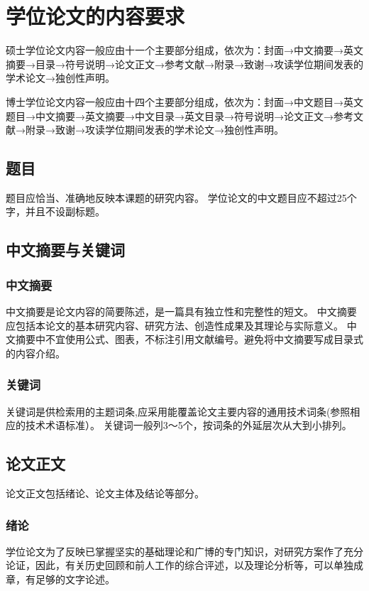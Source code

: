 \section{学位论文的内容要求}

硕士学位论文内容一般应由十一个主要部分组成，依次为：封面→中文摘要→英文摘要→目录→符号说明→论文正文→参考文献→附录→致谢→攻读学位期间发表的学术论文→独创性声明。


博士学位论文内容一般应由十四个主要部分组成，依次为：封面→中文题目→英文题目→中文摘要→英文摘要→中文目录→英文目录→符号说明→论文正文→参考文献→附录→致谢→攻读学位期间发表的学术论文→独创性声明。

\subsection{题目}
题目应恰当、准确地反映本课题的研究内容。
学位论文的中文题目应不超过25个字，并且不设副标题。

\subsection{中文摘要与关键词}

\subsubsection{中文摘要}
中文摘要是论文内容的简要陈述，是一篇具有独立性和完整性的短文。
中文摘要应包括本论文的基本研究内容、研究方法、创造性成果及其理论与实际意义。
中文摘要中不宜使用公式、图表，不标注引用文献编号。避免将中文摘要写成目录式的内容介绍。

\subsubsection{关键词}
关键词是供检索用的主题词条,应采用能覆盖论文主要内容的通用技术词条(参照相应的技术术语标准）。
关键词一般列3～5个，按词条的外延层次从大到小排列。

\subsection{论文正文}
论文正文包括绪论、论文主体及结论等部分。

\subsubsection{绪论}
学位论文为了反映已掌握坚实的基础理论和广博的专门知识，对研究方案作了充分论证，因此，有关历史回顾和前人工作的综合评述，以及理论分析等，可以单独成章，有足够的文字论述。

